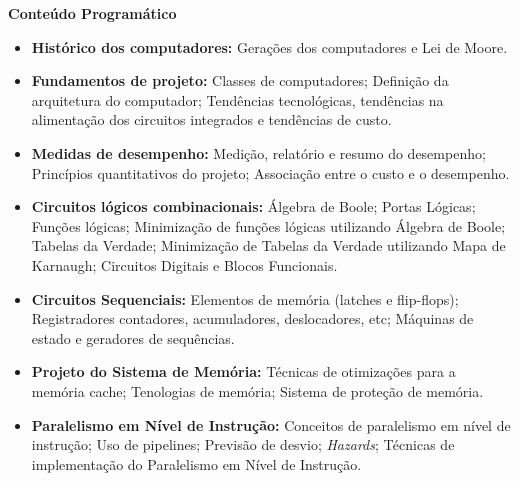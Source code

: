 
\begin{snugshade}\begin{center}\textbf{
    Conteúdo Programático
}\end{center}\end{snugshade}

\begin{itemize}

 \item \textbf{Histórico dos computadores:} Gerações dos computadores e  Lei de Moore.
 
 \item \textbf{Fundamentos de projeto:} Classes de computadores; Definição da arquitetura do computador; Tendências tecnológicas, tendências na alimentação dos circuitos integrados e tendências de custo.
 
 \item \textbf{Medidas de desempenho:} Medição, relatório e resumo do desempenho; Princípios quantitativos do projeto; Associação entre o custo e o desempenho.
 
 \item \textbf{Circuitos lógicos combinacionais:} Álgebra de Boole; Portas Lógicas; Funções lógicas; Minimização de funções lógicas utilizando Álgebra de Boole; Tabelas da Verdade; Minimização de Tabelas da Verdade utilizando Mapa de Karnaugh;  Circuitos Digitais e Blocos Funcionais.
 
 \item \textbf{Circuitos Sequenciais:} Elementos de memória (latches e flip-flops); Registradores contadores, acumuladores, deslocadores, etc; Máquinas de estado e geradores de sequências. 
 
 \item \textbf{Projeto do Sistema de Memória:} Técnicas de otimizações para a memória cache; Tenologias de memória; Sistema de proteção de memória.
 
 \item \textbf{Paralelismo em Nível de Instrução:} Conceitos de paralelismo em nível de instrução; Uso de pipelines; Previsão de desvio; \textit{Hazards}; Técnicas de implementação do Paralelismo em Nível de Instrução. %

\end{itemize}



